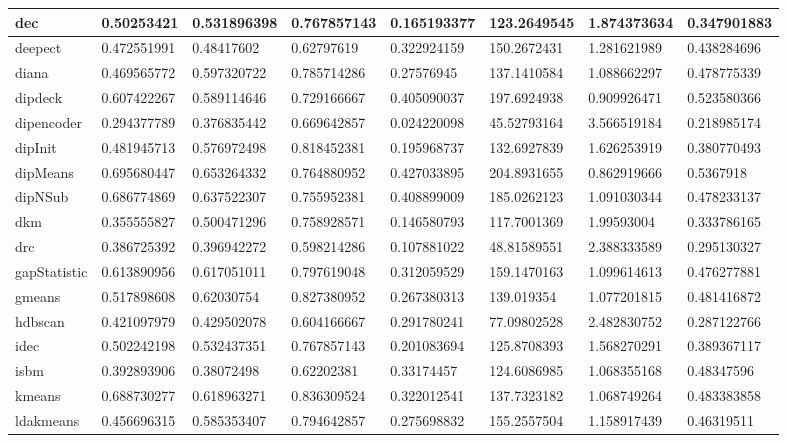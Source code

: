 \begin{table}[H]
\begin{tabular}{|l|l|l|l|l|l|l|l|}
\hline
dec & 0.50253421 & 0.531896398 & 0.767857143 & 0.165193377 & 123.2649545 & 1.874373634 & 0.347901883 \\
\hline
deepect & 0.472551991 & 0.48417602 & 0.62797619 & 0.322924159 & 150.2672431 & 1.281621989 & 0.438284696 \\
\hline
diana & 0.469565772 & 0.597320722 & 0.785714286 & 0.27576945 & 137.1410584 & 1.088662297 & 0.478775339 \\
\hline
dipdeck & 0.607422267 & 0.589114646 & 0.729166667 & 0.405090037 & 197.6924938 & 0.909926471 & 0.523580366 \\
\hline
dipencoder & 0.294377789 & 0.376835442 & 0.669642857 & 0.024220098 & 45.52793164 & 3.566519184 & 0.218985174 \\
\hline
dipInit & 0.481945713 & 0.576972498 & 0.818452381 & 0.195968737 & 132.6927839 & 1.626253919 & 0.380770493 \\
\hline
dipMeans & 0.695680447 & 0.653264332 & 0.764880952 & 0.427033895 & 204.8931655 & 0.862919666 & 0.5367918 \\
\hline
dipNSub & 0.686774869 & 0.637522307 & 0.755952381 & 0.408899009 & 185.0262123 & 1.091030344 & 0.478233137 \\
\hline
dkm & 0.355555827 & 0.500471296 & 0.758928571 & 0.146580793 & 117.7001369 & 1.99593004 & 0.333786165 \\
\hline
drc & 0.386725392 & 0.396942272 & 0.598214286 & 0.107881022 & 48.81589551 & 2.388333589 & 0.295130327 \\
\hline
gapStatistic & 0.613890956 & 0.617051011 & 0.797619048 & 0.312059529 & 159.1470163 & 1.099614613 & 0.476277881 \\
\hline
gmeans & 0.517898608 & 0.62030754 & 0.827380952 & 0.267380313 & 139.019354 & 1.077201815 & 0.481416872 \\
\hline
hdbscan & 0.421097979 & 0.429502078 & 0.604166667 & 0.291780241 & 77.09802528 & 2.482830752 & 0.287122766 \\
\hline
idec & 0.502242198 & 0.532437351 & 0.767857143 & 0.201083694 & 125.8708393 & 1.568270291 & 0.389367117 \\
\hline
isbm & 0.392893906 & 0.38072498 & 0.62202381 & 0.33174457 & 124.6086985 & 1.068355168 & 0.48347596 \\
\hline
kmeans & 0.688730277 & 0.618963271 & 0.836309524 & 0.322012541 & 137.7323182 & 1.068749264 & 0.483383858 \\
\hline
ldakmeans & 0.456696315 & 0.585353407 & 0.794642857 & 0.275698832 & 155.2557504 & 1.158917439 & 0.46319511 \\

\end{tabular}
\end{table}
